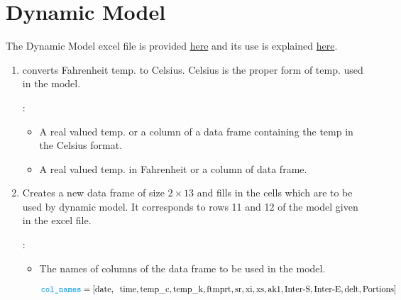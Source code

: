 \section{Dynamic Model}

The Dynamic Model excel file is provided 
\href{http://ucanr.edu/sites/fruittree/How-to_Guides/Dynamic_Model_-_Chill_Accumulation/}{here} and its use is explained 
\href{http://ucanr.edu/sites/fruittree/files/49320.pdf}{here}.


\begin{enumerate}
\item {} converts Fahrenheit temp. to Celsius. Celsius is the proper form of temp. used in the model. 

:
\begin{itemize}
\item {}  A real valued temp. or a column of a 
data frame containing the temp in the Celsius format.
\end{itemize}


\begin{itemize}
\item A real valued temp. in Fahrenheit or a column of
data frame.
\end{itemize}


\item {} Creates a new data frame 
of size $2 \times 13$ and fills in the cells which are to be used
by dynamic model. It corresponds to rows 11 and 12 of the 
model given in the excel file.

:

\begin{itemize}
\item {}  The names of columns of the data frame to be used in the model.

{\footnotesize {$ \vari{col\_names} = [ \text{date}, \:
                                    \text{ time}, 
                                     \text{temp\_c}, 
                                     \text{temp\_k}, 
                                     \text{ftmprt}, 
                                     \text{sr}, 
                                     \text{xi}, 
                                     \text{xs}, 
                                     \text{ak1}, 
                                     \text{Inter-S}, 
                                     \text{Inter-E},
                                     \text{delt}, 
                                     \text{Portions}] $}}


\end{itemize}
\end{enumerate}
